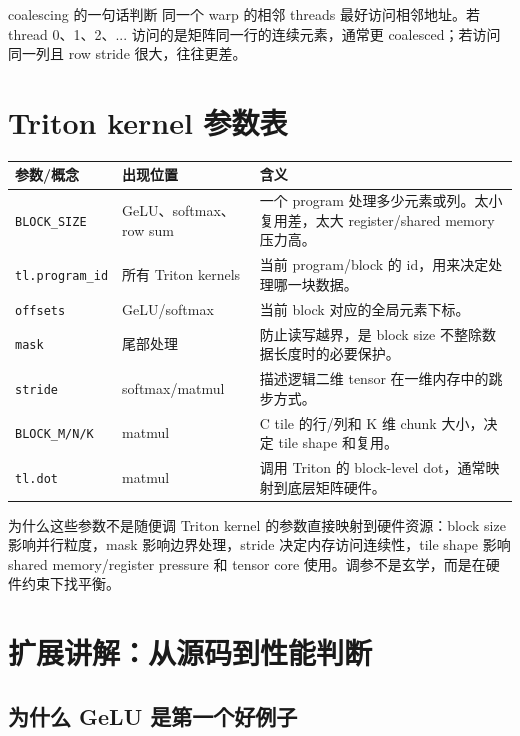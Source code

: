\documentclass[a4paper]{article}
\begin{document}
\begin{importantbox}{coalescing 的一句话判断}
同一个 warp 的相邻 threads 最好访问相邻地址。若 thread 0、1、2、... 访问的是矩阵同一行的连续元素，通常更 coalesced；若访问同一列且 row stride 很大，往往更差。
\end{importantbox}

\section{Triton kernel 参数表}

\begin{longtable}{p{}p{}p{}}
\toprule
\textbf{参数/概念} & \textbf{出现位置} & \textbf{含义} \\
\midrule
\texttt{BLOCK\_SIZE} & GeLU、softmax、row sum & 一个 program 处理多少元素或列。太小复用差，太大 register/shared memory 压力高。 \\
\texttt{tl.program\_id} & 所有 Triton kernels & 当前 program/block 的 id，用来决定处理哪一块数据。 \\
\texttt{offsets} & GeLU/softmax & 当前 block 对应的全局元素下标。 \\
\texttt{mask} & 尾部处理 & 防止读写越界，是 block size 不整除数据长度时的必要保护。 \\
\texttt{stride} & softmax/matmul & 描述逻辑二维 tensor 在一维内存中的跳步方式。 \\
\texttt{BLOCK\_M/N/K} & matmul & C tile 的行/列和 K 维 chunk 大小，决定 tile shape 和复用。 \\
\texttt{tl.dot} & matmul & 调用 Triton 的 block-level dot，通常映射到底层矩阵硬件。 \\
\bottomrule
\end{longtable}

\begin{knowledgebox}{为什么这些参数不是随便调}
Triton kernel 的参数直接映射到硬件资源：block size 影响并行粒度，mask 影响边界处理，stride 决定内存访问连续性，tile shape 影响 shared memory/register pressure 和 tensor core 使用。调参不是玄学，而是在硬件约束下找平衡。
\end{knowledgebox}



\section{扩展讲解：从源码到性能判断}

\subsection{为什么 GeLU 是第一个好例子}
\end{document}
